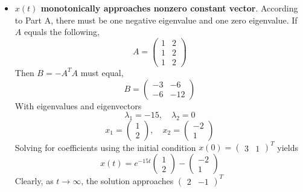 \documentclass{article}
\begin{document}
\begin{itemize}
  \item {\bf $x(t)$ monotonically approaches nonzero constant vector}.
  According to Part A, there must be one negative eigenvalue and one zero
  eigenvalue. If $A$ equals the following,
  $$ A = \begin{pmatrix}
    1 & 2 \\
    1 & 2 \\
    1 & 2
  \end{pmatrix} $$
  Then $B = -A^T A$ must equal,
  $$ B = \begin{pmatrix}
    -3 & -6 \\
    -6 & -12
  \end{pmatrix} $$
  With eigenvalues and eigenvectors
  $$ \lambda_1 = -15,\quad \lambda_2 = 0 $$
  $$ x_1 = \begin{pmatrix}
    1 \\
    2
  \end{pmatrix},\quad x_2 = \begin{pmatrix}
    -2 \\
    1
  \end{pmatrix} $$
  Solving for coefficients using the initial condition $x(0) =
  \begin{pmatrix} 3 & 1 \end{pmatrix}^T$ yields
  $$ x(t) = e^{-15 t} \begin{pmatrix}
    1 \\
    2
  \end{pmatrix} - \begin{pmatrix}
    -2 \\
    1
  \end{pmatrix} $$
  Clearly, as $t \longrightarrow \infty$, the solution approaches
  $\begin{pmatrix} 2 & -1 \end{pmatrix}^T $


\end{itemize}
\end{document}
